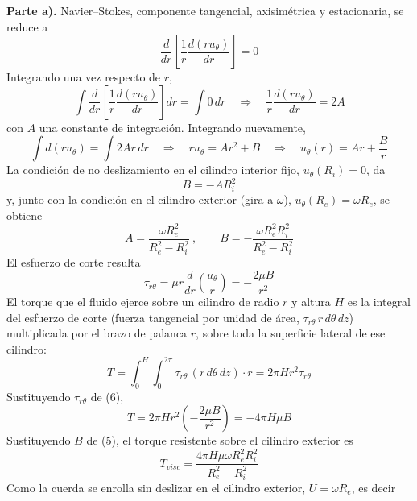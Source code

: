 \documentclass[11pt]{article}
\begin{document}
\textbf{Parte a).}
Navier--Stokes, componente tangencial, axisim\'etrica y estacionaria, se reduce a
\begin{equation}
\frac{d}{dr}\!\left[\frac1r\frac{d(ru_\theta)}{dr}\right]=0
\end{equation}
Integrando una vez respecto de $r$,
\begin{equation}
\int\frac{d}{dr}\!\left[\frac1r\frac{d(ru_\theta)}{dr}\right]dr=\int 0\,dr
\quad\Longrightarrow\quad
\frac1r\frac{d(ru_\theta)}{dr}=2A
\end{equation}
con $A$ una constante de integraci\'on. Integrando nuevamente,
\begin{equation}
\int d(ru_\theta)=\int 2Ar\,dr
\quad\Longrightarrow\quad
ru_\theta=Ar^2+B
\quad\Longrightarrow\quad
u_\theta(r)=Ar+\frac Br
\end{equation}
La condici\'on de no deslizamiento en el cilindro interior fijo, $u_\theta(R_i)=0$, da
\begin{equation}
B=-AR_i^2
\end{equation}
y, junto con la condici\'on en el cilindro exterior (gira a $\omega$),
$u_\theta(R_e)=\omega R_e$, se obtiene
\begin{equation}
A=\frac{\omega R_e^2}{R_e^2-R_i^2}\ ,\qquad B=-\frac{\omega R_e^2R_i^2}{R_e^2-R_i^2}
\end{equation}
El esfuerzo de corte resulta
\begin{equation}
\tau_{r\theta}=\mu r\frac{d}{dr}\!\left(\frac{u_\theta}{r}\right)=-\frac{2\mu B}{r^2}
\end{equation}
El torque que el fluido ejerce sobre un cilindro de radio $r$ y altura $H$ es la
integral del esfuerzo de corte (fuerza tangencial por unidad de \'area, $\tau_{r\theta}\,r\,d\theta\,dz$)
multiplicada por el brazo de palanca $r$, sobre toda la superficie lateral de ese cilindro:
\begin{equation}
T=\int_0^{H}\!\!\int_0^{2\pi}\tau_{r\theta}\,(r\,d\theta\,dz)\cdot r
=2\pi Hr^2\tau_{r\theta}
\end{equation}
Sustituyendo $\tau_{r\theta}$ de (6),
\begin{equation}
T=2\pi Hr^2\left(-\frac{2\mu B}{r^2}\right)=-4\pi H\mu B
\end{equation}
Sustituyendo $B$ de (5), el torque resistente sobre el cilindro exterior es
\begin{equation}
T_{visc}=\frac{4\pi H\mu\omega R_e^2R_i^2}{R_e^2-R_i^2}
\end{equation}
Como la cuerda se enrolla sin deslizar en el cilindro exterior, $U=\omega R_e$, es decir
\end{document}

